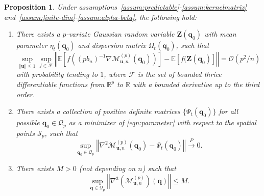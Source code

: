 \documentclass[aos]{imsart}
\theoremstyle{plain}
\newtheorem{proposition}{Proposition}
\theoremstyle{remark}
\def\E{\mathbb{E}}
\def\R{\mathbb{R}}
\newcommand{\Mcal}{\mathcal{M}}
\newcommand{\Scal}{\mathcal{S}}
\newcommand{\bb}[1]{\boldsymbol{#1}}
\newcommand{\cnam}[1]{\textcolor{mypurple}{#1}}
\begin{document}
\begin{proposition}\label{prop:P1P3}
Under assumptions~\ref{assum:predictable}-\ref{assum:kernelmatrix} and~\ref{assum:finite-dim}-\ref{assum:alpha-beta}, the following hold:
\begin{enumerate}[label=(P\arabic*),ref=(P\arabic*)]
    \item\label{prop:first-div-dist} There exists a $p$-variate Gaussian random variable $\bb{Z}(\bb{q}_0)$ with mean parameter $\eta_t(\bb{q}_0)$ and dispersion matrix $\Omega_t(\bb{q}_0)$, such that 
    \begin{equation*}
        \sup_{\Vert \bb{u}\Vert \leq 1}\sup_{f \in \mathcal{F}} \left\Vert \E\left[ f\left( (pb_n)^{-1} \nabla \Mcal_{\bb{u},n}^{(p)} (\bb{q}_0) \right) \right] - \E\left[ f(\bb{Z}(\bb{q}_0) \right] \right\Vert = \mathcal{O}(p^2/n)
    \end{equation*}
     \noindent with probability tending to $1$, where $\mathcal{F}$ is the set of bounded thrice differentiable functions from $\R^{p}$ to $\R$ with a bounded derivative \cnam{up to the third order.}
    \item\label{prop:second-div-mat} There exists a collection of positive definite matrices $\{ \Psi_t(\bb{q}_0) \}$ for all possible $\bb{q}_0 \in \mathcal{Q}_p$ as a minimizer of \eqref{eqn:parameter} with respect to the spatial points $\Scal_p$, such that 
    \begin{equation*}
        \sup_{\bb{q}_0 \in \mathcal{Q}_p} \left\Vert \nabla^2 \Mcal_{\bb{u},n}^{(p)}(\bb{q}_0)-\Psi_t(\bb{q}_0) \right\Vert \xrightarrow{P} 0.
    \end{equation*}
    \item\label{prop:third-div-bound} There exists $M > 0$ (not depending on $n$) such that 
    \begin{equation*}
       \sup_{\bb{q} \in \mathcal{Q}_p} \left\Vert \nabla^{3} (\Mcal_{\bb{u},n}^{(p)})(\bb{q}) \right\Vert \leq M.
    \end{equation*}
\end{enumerate}
    
\end{proposition}
\end{document}
